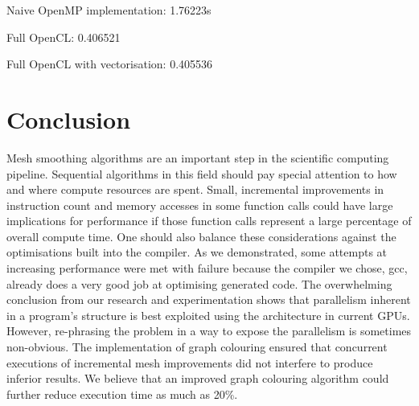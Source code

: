 \documentclass[a4paper,11pt, twocolumn]{article}
\begin{document}
Naive OpenMP implementation: 1.76223s

Full OpenCL: 0.406521

Full OpenCL with vectorisation: 0.405536

\section{Conclusion}
Mesh smoothing algorithms are an important step in the scientific computing pipeline.  Sequential algorithms in this field  should pay special attention to how and where compute resources are spent.  Small, incremental improvements in instruction count and memory accesses in some function calls could have large implications for performance if those function calls represent a large percentage of overall compute time.  One should also balance these considerations against the optimisations built into the compiler.  As we demonstrated, some attempts at increasing performance were met with failure because the compiler we chose, gcc, already does a very good job at optimising generated code.  The overwhelming conclusion from our research and experimentation shows that parallelism inherent in a program's structure is best exploited using the architecture in current GPUs.  However, re-phrasing the problem in a way to expose the parallelism is sometimes non-obvious.  The implementation of graph colouring ensured that concurrent executions of incremental mesh improvements did not interfere to produce inferior results.  We believe that an improved graph colouring algorithm could further reduce execution time as much as 20\%.

\end{document}
